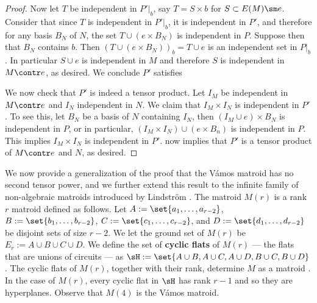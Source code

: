 \begin{proof}
        
        Now let $T$ be independent in $P'|_b$, say $T=S\times b$ for $S\subset E(M)\sm e$. Consider that since $T$ is independent in $P'|_b$, it is independent in $P'$, and therefore for any basis $B_N$ of $N$, the set $T\cup (e\times B_N)$ is independent in $P$. Suppose then that $B_N$ contains $b$. Then $\left(T\cup(e\times B_N)\right)_b = T\cup e$ is an independent set in $P|_b$. In particular $S\cup e$ is independent in $M$ and therefore $S$ is independent in $M\contr e$, as desired. We conclude $P'$ satisfies 

        We now check that $P'$ is indeed a tensor product. Let $I_M$ be independent in $M\contr e$ and $I_N$ independent in $N$. We claim that $I_M\times I_N$ is independent in $P'$. To see this, let $B_N$ be a basis of $N$ containing $I_N$, then $(I_M\cup e)\times B_N$ is independent in $P$, or in particular, $(I_M\times I_N) \cup (e\times B_n)$ is independent in $P$. This implies $I_M\times I_N$ is independent in $P'$.  now implies that $P'$ is a tensor product of $M\contr e$ and $N$, as desired.
    \end{proof}

    We now provide a generalization of the proof that the V\'amos matroid has no second tensor power, and we further extend this result to the infinite family of non-algebraic matroids introduced by Lindstr\"om \cite{Lind88}. The matroid $M(r)$ is a rank $r$ matroid defined as follows. Let $A:=\set{a_1,\dots, a_{r-2}}$, $B:=\set{b_1,\dots, b_{r-2}}$, $C:=\set{c_1,\dots, c_{r-2}}$, and $D:=\set{d_1,\dots, d_{r-2}}$ be disjoint sets of size $r-2$. We let the ground set of $M(r)$ be $E_r:= A\cup B\cup C\cup D$. We define the set of \textbf{cyclic flats} of $M(r)$ --- the flats that are unions of circuits --- as $\sH:= \set{A\cup B, A\cup C, A\cup D, B\cup C, B\cup D}$. The cyclic flats of $M(r)$, together with their rank, determine $M$ as a matroid \cite{Bry75}. In the case of $M(r)$, every cyclic flat in $\sH$ has rank $r-1$ and so they are hyperplanes. Observe that $M(4)$ is the V\'amos matroid.


